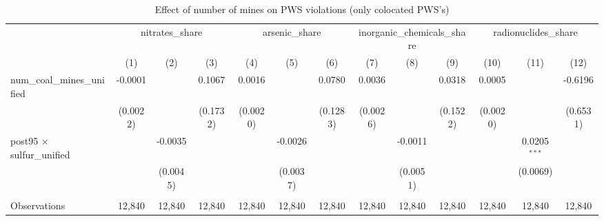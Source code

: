 
\begin{table}[htbp]
   \caption{\label{olsrf2sls_nummine_mine_vio_1985to2005colocate_coalunified} Effect of number of mines on PWS violations (only colocated PWS's)}
   \bigskip
   \centering
   \begin{adjustbox}{width = \textwidth, center}
      \begin{tabular}{lcccccccccccc}
         \toprule
          & \multicolumn{3}{c}{nitrates\_share} & \multicolumn{3}{c}{arsenic\_share} & \multicolumn{3}{c}{inorganic\_chemicals\_share} & \multicolumn{3}{c}{radionuclides\_share}\\
                                                          & (1)                   & (2)           & (3)           & (4)           & (5)           & (6)           & (7)           & (8)                   & (9)                   & (10)                  & (11)           & (12)\\  
         \midrule 
         num\_coal\_mines\_unified                        & -0.0001               &               & 0.1067        & 0.0016        &               & 0.0780        & 0.0036        &                       & 0.0318                & 0.0005                &                & -0.6196\\   
                                                          & (0.0022)              &               & (0.1732)      & (0.0020)      &               & (0.1283)      & (0.0026)      &                       & (0.1522)              & (0.0020)              &                & (0.6531)\\   
         post95 $\times$ sulfur\_unified                  &                       & -0.0035       &               &               & -0.0026       &               &               & -0.0011               &                       &                       & 0.0205$^{***}$ &   \\   
                                                          &                       & (0.0045)      &               &               & (0.0037)      &               &               & (0.0051)              &                       &                       & (0.0069)       &   \\   
          \\
         Observations                                     & 12,840                & 12,840        & 12,840        & 12,840        & 12,840        & 12,840        & 12,840        & 12,840                & 12,840                & 12,840                & 12,840         & 12,840\\  

\end{tabular}
\end{adjustbox}
\end{table}
